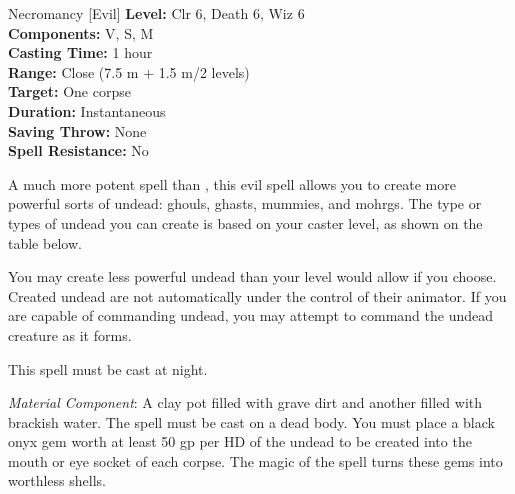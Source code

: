 {Necromancy [Evil]}
{
	\textbf{Level:}
	Clr 6, Death 6, Wiz 6\\
	\textbf{Components:}
	V, S, M\\
	\textbf{Casting Time:}
	1 hour\\
	\textbf{Range:}
	Close (7.5 m + 1.5 m/2 levels)\\
	\textbf{Target:}
	One corpse\\
	\textbf{Duration:}
	Instantaneous\\
	\textbf{Saving Throw:}
	None\\
	\textbf{Spell Resistance:}
	No\\
}
{
	A much more potent spell than , this evil spell allows you to create more powerful sorts of undead: ghouls, ghasts, mummies, and mohrgs. The type or types of undead you can create is based on your caster level, as shown on the table below.


	You may create less powerful undead than your level would allow if you choose. Created undead are not automatically under the control of their animator. If you are capable of commanding undead, you may attempt to command the undead creature as it forms.

	This spell must be cast at night.

	\textit{Material Component}:
	A clay pot filled with grave dirt and another filled with brackish water. The spell must be cast on a dead body. You must place a black onyx gem worth at least 50 gp per HD of the undead to be created into the mouth or eye socket of each corpse. The magic of the spell turns these gems into worthless shells.

}
